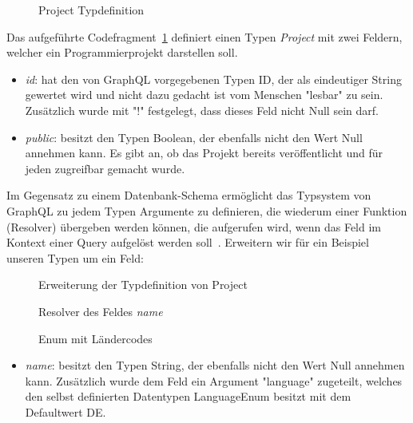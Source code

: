 \begin{figure}[h]
    
    \caption{Project Typdefinition}
    \label{fig:basics:graphql:1}
\end{figure}

Das aufgeführte Codefragment~\ref{fig:basics:graphql:1} definiert einen Typen \emph{Project} mit zwei Feldern, welcher ein Programmierprojekt darstellen soll.
\begin{itemize}
    \item \emph{id}: hat den von GraphQL vorgegebenen Typen ID, der als eindeutiger String gewertet wird und nicht dazu gedacht ist vom Menschen "lesbar" zu sein.
    Zusätzlich wurde mit "!" festgelegt, dass dieses Feld nicht Null sein darf.
    \item \emph{public}: besitzt den Typen Boolean, der ebenfalls nicht den Wert Null annehmen kann.
    Es gibt an, ob das Projekt bereits veröffentlicht und für jeden zugreifbar gemacht wurde.
\end{itemize}

Im Gegensatz zu einem Datenbank-Schema ermöglicht das Typsystem von GraphQL zu jedem Typen Argumente zu definieren,
die wiederum einer Funktion (Resolver) übergeben werden können,
die aufgerufen wird, wenn das Feld im Kontext einer Query aufgelöst werden soll~\cite{graphql-resolver}.
Erweitern wir für ein Beispiel unseren Typen um ein Feld:

\begin{figure}[h]
    
    \caption{Erweiterung der Typdefinition von Project}
    \label{fig:basics:graphql:3}
\end{figure}

\begin{figure}[h]
    
    \caption{Resolver des Feldes \emph{name}}
    \label{fig:basics:graphql:4}
\end{figure}

\begin{figure}[h]
    
    \caption{Enum mit Ländercodes}
    \label{fig:basics:graphql:2}
\end{figure}

\begin{itemize}
    \item \emph{name}: besitzt den Typen String, der ebenfalls nicht den Wert Null annehmen kann. Zusätzlich wurde dem Feld ein Argument "language" zugeteilt,
    welches den selbst definierten Datentypen LanguageEnum besitzt mit dem Defaultwert DE.
\end{itemize}

